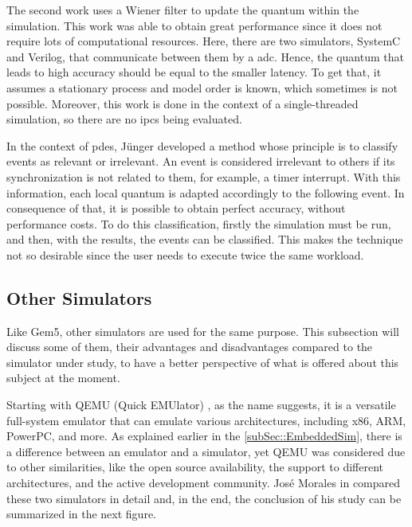 The second work uses a Wiener filter to update the quantum within the simulation. This work was able to obtain great performance since it 
does not require lots of computational resources. Here, there are two simulators, SystemC and Verilog, that communicate between them by 
a \gls{adc}. Hence, the quantum that leads to high accuracy should be equal to the smaller latency. To get that, it assumes a stationary 
process and model order is known, which sometimes is not possible. Moreover, this work is done in the context of a single-threaded simulation, 
so there are no \glspl{ipc} being evaluated.

In the context of \gls{pdes}, Jünger developed a method whose principle is to classify events as relevant or irrelevant. An event is considered 
irrelevant to others if its synchronization is not related to them, for example, a timer interrupt. With this information, each local quantum is 
adapted accordingly to the following event. In consequence of that, it is possible to obtain perfect accuracy, without performance costs. To do 
this classification, firstly the simulation must be run, and then, with the results, the events can be classified. This makes the technique not so 
desirable since the user needs to execute twice the same workload. 


\subsection{Other Simulators}


Like Gem5, other simulators are used for the same purpose. This subsection will discuss some of them, their advantages and disadvantages 
compared to the simulator under study, to have a better perspective of what is offered about this subject at the moment. 

Starting with QEMU (Quick EMUlator) \cite{theQEMUsimulator}, as the name suggests, it is a versatile full-system emulator that can emulate 
various architectures, including x86, ARM, PowerPC, and more. As explained earlier in the \autoref{subSec::EmbeddedSim}, there is a difference 
between an emulator and a simulator, yet QEMU was considered due to other similarities, like the open source availability, the support to 
different architectures, and the active development community. José Morales in \cite{morales2016evaluating} compared these two simulators in 
detail and, in the end, the conclusion of his study can be summarized in the next figure.


